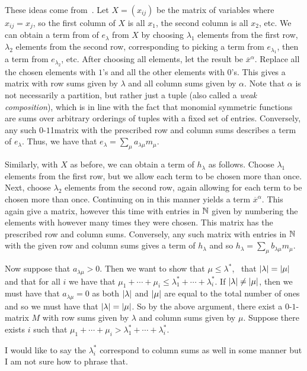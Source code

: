 \documentclass[letterpaper, 11pt, oneside]{book}
\begin{document}
\begin{sol}\label{ex:Manivel_1.1.7}
  These ideas come from~\cite[Proposition 7.4.1]{book:ECII}.
  Let $X = (x_{ij})$ be the matrix of variables where $x_{ij} = x_{j}$, so the first column of $X$ is all $x_{1}$, the second column is all $x_{2}$, etc.
  We can obtain a term from of $e_{\lambda}$ from $X$ by choosing $\lambda_{1}$ elements from the first row, $\lambda_{2}$ elements from the second row, corresponding to picking a term from $e_{\lambda_{1}}$, then a term from $e_{\lambda_{2}}$, etc.
  After choosing all elements, let the result be $\overline{x}^{\alpha}$.
  Replace all the chosen elements with $1$'s and all the other elements with $0$'s.
  This gives a matrix with row sums given by $\lambda$ and all column sums given by $\alpha$.
  Note that $\alpha$ is not necessarily a partition, but rather just a tuple (also called a \emph{weak composition}), which is in line with the fact that monomial symmetric functions are sums over arbitrary orderings of tuples with a fixed set of entries.
  Conversely, any such $0$-$1$1matrix with the prescribed row and column sums describes a term of $e_{\lambda}$.
  Thus, we have that $e_{\lambda} = \sum_{\mu} a_{\lambda \mu} m_{\mu}$.

  Similarly, with $X$ as before, we can obtain a term of $h_{\lambda}$ as follows.
  Choose $\lambda_{1}$ elements from the first row, but we allow each term to be chosen more than once.
  Next, choose $\lambda_{2}$ elements from the second row, again allowing for each term to be chosen more than once.
  Continuing on in this manner yields a term $\overline{x}^{\alpha}$.
  This again give a matrix, however this time with entries in $\mathbb{N}$ given by numbering the elements with however many times they were chosen.
  This matrix has the prescribed row and column sums.
  Conversely, any such matrix with entries in $\mathbb{N}$ with the given row and column sums gives a term of $h_{\lambda}$ and so $h_{\lambda} = \sum_{\mu} b_{\lambda \mu} m_{\mu}$.

  Now suppose that $a_{\lambda \mu} > 0$.
  Then we want to show that $\mu \leq \lambda^{*}$,  \ie\ that $\abs{\lambda} = \abs{\mu}$ and that for all $i$ we have that $\mu_{1} + \cdots + \mu_{i} \leq \lambda^{*}_{1} + \cdots + \lambda^{*}_{i}$.
  If $\abs{\lambda} \neq \abs{\mu}$, then we must have that $a_{\lambda \mu} = 0$ as both $\abs{\lambda}$ and $\abs{\mu}$ are equal to the total number of ones and so we must have that $\abs{\lambda} = \abs{\mu}$.
  So by the above argument, there exist a $0$-$1$-matrix $M$ with row sums given by $\lambda$ and column sums given by $\mu$.
  Suppose there exists $i$ such that $\mu_{1} + \cdots + \mu_{i} > \lambda_{1}^{*} + \cdots + \lambda_{i}^{*}$.

   I would like to say the $\lambda_{i}^{*}$ correspond to column sums as well in some manner but I am not sure how to phrase that.
\end{sol}
\end{document}
